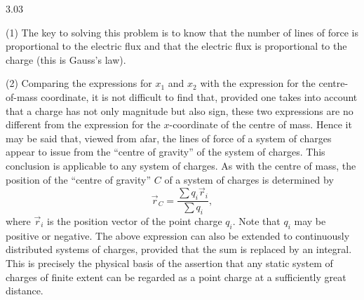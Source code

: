 \begin{solution}{3.03}
\begin{commentary}
(1) The key to solving this problem is to know that the number of lines of force is proportional to the electric flux and that the electric flux is proportional to the charge (this is Gauss's law).

(2) Comparing the expressions for $x_1$ and $x_2$ with the expression for the centre-of-mass coordinate, it is not difficult to find that, provided one takes into account that a charge has not only magnitude but also sign, these two expressions are no different from the expression for the $x$-coordinate of the centre of mass. Hence it may be said that, viewed from afar, the lines of force of a system of charges appear to issue from the ``centre of gravity'' of the system of charges. This conclusion is applicable to any system of charges. As with the centre of mass, the position of the ``centre of gravity'' $C$ of a system of charges is determined by
\[
\vec{r}_C=\frac{\sum q_i\vec{r}_i}{\sum q_i},
\]
where $\vec{r}_i$ is the position vector of the point charge $q_i$. Note that $q_i$ may be positive or negative. The above expression can also be extended to continuously distributed systems of charges, provided that the sum is replaced by an integral. This is precisely the physical basis of the assertion that any static system of charges of finite extent can be regarded as a point charge at a sufficiently great distance.
\end{commentary}
\end{solution}

